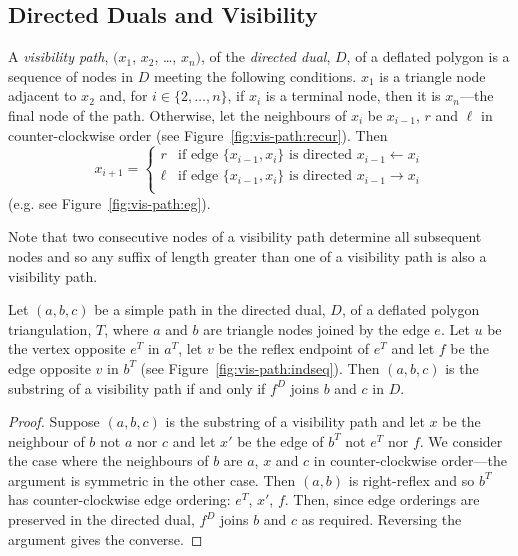 \documentclass{amsart}
\begin{document}

\subsection{Directed Duals and Visibility}

A \emph{visibility path}, $(x_1$, $x_2$, \ldots, $x_n)$, of
the \emph{directed dual}, $D$, of a deflated polygon is a sequence of
nodes in $D$ meeting the following conditions.  $x_1$ is a triangle
node adjacent to $x_2$ and, for $i\in\{2,\ldots,n\}$, if $x_i$ is a
terminal node, then it is $x_n$---the final node of the path.
Otherwise, let the neighbours of $x_i$ be $x_{i-1}$, $r$ and $\ell$ in
counter-clockwise order (see Figure~\ref{fig:vis-path:recur}).  Then
\[ x_{i+1} = 
\begin{cases}
  r & \text{if edge $\{x_{i-1}, x_i\}$ is directed $x_{i-1}\leftarrow x_i$} \\
  \ell & \text{if edge $\{x_{i-1}, x_i\}$ is directed $x_{i-1}\rightarrow x_i$} \\
\end{cases}
\]
(e.g. see Figure~\ref{fig:vis-path:eg}).

\iffullversion
Note that two consecutive nodes of a visibility path determine all
subsequent nodes and so any suffix of length greater than one of a
visibility path is also a visibility path.
\fi

\begin{lemma}
  \label{lem:vis-path-geom}
  Let $(a,b,c)$ be a simple path in the directed dual, $D$, of a
  deflated polygon triangulation, $T$, where $a$ and $b$ are triangle
  nodes joined by the edge $e$.  Let $u$ be the vertex opposite $e^T$
  in $a^T$, let $v$ be the reflex endpoint of $e^T$ and let $f$ be the
  edge opposite $v$ in $b^T$ (see Figure~\ref{fig:vis-path:indseq}).
  Then $(a,b,c)$ is the substring of a visibility path if and only if
  $f^D$ joins $b$ and $c$ in $D$.
\end{lemma}
\begin{proof}
  Suppose $(a,b,c)$ is the substring of a visibility path and let $x$
  be the neighbour of $b$ not $a$ nor $c$ and let $x'$ be the edge of
  $b^T$ not $e^T$ nor $f$. We consider the case where the neighbours
  of $b$ are $a$, $x$ and $c$ in counter-clockwise order---the
  argument is symmetric in the other case.  Then $(a,b)$ is
  right-reflex and so $b^T$ has counter-clockwise edge ordering:
  $e^T$, $x'$, $f$.  Then, since edge orderings are preserved in the
  directed dual, $f^D$ joins $b$ and $c$ as required.  Reversing the
  argument gives the converse.
\end{proof}
\end{document}
